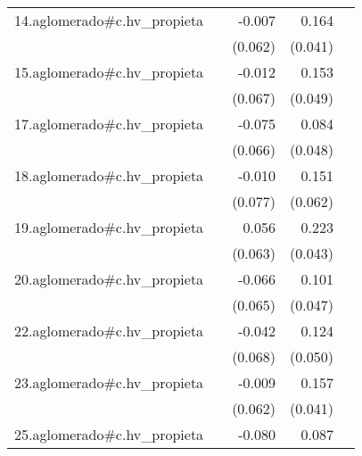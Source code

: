 {\begin{longtable}{l*{4}{D{.}{.}{-1}}}
\addlinespace
14.aglomerado#c.hv\_propieta&                     &      -0.007         &       0.164\sym{***}&                     \\
            &                     &     (0.062)         &     (0.041)         &                     \\
\addlinespace
15.aglomerado#c.hv\_propieta&                     &      -0.012         &       0.153\sym{**} &                     \\
            &                     &     (0.067)         &     (0.049)         &                     \\
\addlinespace
17.aglomerado#c.hv\_propieta&                     &      -0.075         &       0.084         &                     \\
            &                     &     (0.066)         &     (0.048)         &                     \\
\addlinespace
18.aglomerado#c.hv\_propieta&                     &      -0.010         &       0.151\sym{*}  &                     \\
            &                     &     (0.077)         &     (0.062)         &                     \\
\addlinespace
19.aglomerado#c.hv\_propieta&                     &       0.056         &       0.223\sym{***}&                     \\
            &                     &     (0.063)         &     (0.043)         &                     \\
\addlinespace
20.aglomerado#c.hv\_propieta&                     &      -0.066         &       0.101\sym{*}  &                     \\
            &                     &     (0.065)         &     (0.047)         &                     \\
\addlinespace
22.aglomerado#c.hv\_propieta&                     &      -0.042         &       0.124\sym{*}  &                     \\
            &                     &     (0.068)         &     (0.050)         &                     \\
\addlinespace
23.aglomerado#c.hv\_propieta&                     &      -0.009         &       0.157\sym{***}&                     \\
            &                     &     (0.062)         &     (0.041)         &                     \\
\addlinespace
25.aglomerado#c.hv\_propieta&                     &      -0.080         &       0.087         &                     \\

\end{longtable}}
